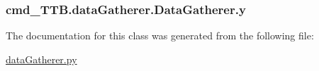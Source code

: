 \subsubsection[{\texorpdfstring{y}{y}}]{\setlength{\rightskip}{0pt plus 5cm}cmd\+\_\+\+T\+T\+B.\+data\+Gatherer.\+Data\+Gatherer.\+y}\hypertarget{classcmd__TTB_1_1dataGatherer_1_1DataGatherer_a3b8b2b639cad9c1192ef10efa68f2b51}{}\label{classcmd__TTB_1_1dataGatherer_1_1DataGatherer_a3b8b2b639cad9c1192ef10efa68f2b51}


The documentation for this class was generated from the following file\+:\begin{DoxyCompactItemize}
\item 
\hyperlink{dataGatherer_8py}{data\+Gatherer.\+py}\end{DoxyCompactItemize}
